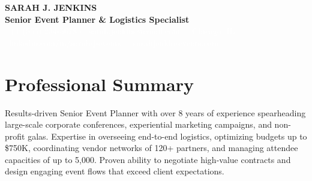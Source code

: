 \documentclass{article}
\begin{document}
\begin{tcolorbox}[colback=primaryColor, colframe=primaryColor, arc=0pt, outer arc=0pt, left=15pt, right=15pt, top=10pt, bottom=10pt, boxrule=0pt]
  \begin{center}
    {\Huge\bfseries\color{white} SARAH J. JENKINS}\\[4pt]{}
    {\large\bfseries\color{headerAccent} Senior Event Planner \& Logistics Specialist}\\[6pt]{}
    \textcolor{white}{\small
      \faPhone\ +1 (555) 234-5678 \quad$\cdot$\quad
      \faEnvelope\ sarah.jenkins@email.com \quad$\cdot$\quad
      \faMapMarker\ Chicago, IL \quad$\cdot$\quad
      \faLinkedin\ linkedin.com/in/sarah-j-events \quad$\cdot$\quad
      \faGlobe\ sarahjenkinsevents.com
    }
  \end{center}
\end{tcolorbox}

\vspace{8pt}

\section*{Professional Summary}
Results-driven Senior Event Planner with over 8 years of experience spearheading large-scale corporate conferences, experiential marketing campaigns, and non-profit galas. Expertise in overseeing end-to-end logistics, optimizing budgets up to \$750K, coordinating vendor networks of 120+ partners, and managing attendee capacities of up to 5,000. Proven ability to negotiate high-value contracts and design engaging event flows that exceed client expectations.

\vspace{6pt}
\end{document}

